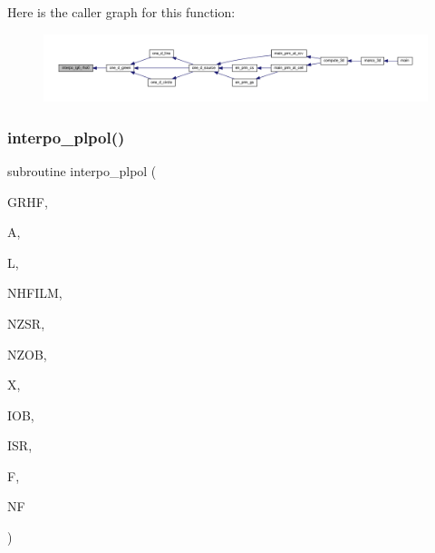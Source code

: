 Here is the caller graph for this function\+:
\nopagebreak
\begin{figure}[H]
\begin{center}
\leavevmode
\includegraphics[width=350pt]{Marco_8f90_a26481105d1de3f776fc36a094d319fbb_icgraph}
\end{center}
\end{figure}
\mbox{\label{Marco_8f90_afd0f4c3b7f02fba61d9bd11b3a142ac2}} 
\subsubsection{\texorpdfstring{interpo\+\_\+plpol()}{interpo\_plpol()}}
{\footnotesize\ttfamily subroutine interpo\+\_\+plpol (\begin{DoxyParamCaption}\item[{complex, dimension(11,nhfilm,nzsr,nzob), intent(in)}]{G\+R\+HF,  }\item[{real, dimension(l), intent(in)}]{A,  }\item[{integer, intent(in)}]{L,  }\item[{integer, intent(in)}]{N\+H\+F\+I\+LM,  }\item[{integer, intent(in)}]{N\+Z\+SR,  }\item[{integer, intent(in)}]{N\+Z\+OB,  }\item[{real}]{X,  }\item[{integer, intent(in)}]{I\+OB,  }\item[{integer, intent(in)}]{I\+SR,  }\item[{complex, dimension(nf), intent(out)}]{F,  }\item[{integer, intent(in)}]{NF }\end{DoxyParamCaption})}

